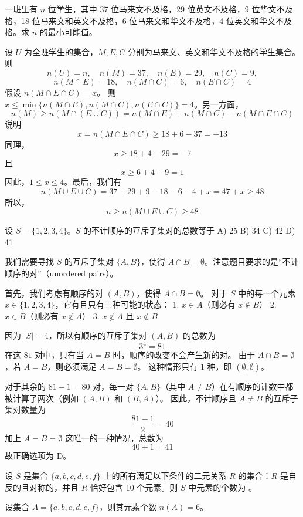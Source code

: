\begin{questions}
\question 一班里有 $n$ 位学生，其中 37 位马来文不及格，29 位英文不及格，9 位华文不及格，18 位马来文和英文不及格，6 位马来文和华文不及格，4 位英文和华文不及格。求 $n$ 的最小可能值。

\begin{solution}
设 $U$ 为全班学生的集合，$M, E, C$ 分别为马来文、英文和华文不及格的学生集合。则
\[
n(U) = n, \quad n(M) = 37, \quad n(E) = 29, \quad n(C) = 9,
\]
\[
n(M \cap E) = 18, \quad n(M \cap C) = 6, \quad n(E \cap C) = 4
\]
假设 $n(M \cap E \cap C) = x$。
则 $x \le \min\{n(M \cap E), n(M \cap C), n(E \cap C)\} = 4$。另一方面，
\[
n(M) \ge n(M \cap (E \cup C)) = n(M \cap E) + n(M \cap C) - n(M \cap E \cap C)
\]
说明
\[
x = n(M \cap E \cap C) \ge 18 + 6 - 37 = -13
\]
同理，
\[
x \ge 18 + 4 - 29 = -7
\]
且
\[
x \ge 6 + 4 - 9 = 1
\]
因此，$1 \le x \le 4$。最后，我们有
\[
n(M \cup E \cup C) = 37 + 29 + 9 - 18 - 6 - 4 + x = 47 + x \ge 48
\]
所以，
\[
n \ge n(M \cup E \cup C) \ge 48
\]
\end{solution}

\question 设 $S = \{1, 2, 3, 4\}$。$S$ 的不计顺序的互斥子集对的总数等于
A) 25 \qquad B) 34 \qquad C) 42 \qquad D) 41

\begin{solution}
我们需要寻找 $S$ 的互斥子集对 $\{A, B\}$，使得 $A \cap B = \emptyset$。注意题目要求的是“不计顺序的对”（unordered pairs）。

首先，我们考虑有顺序的对 $(A, B)$，使得 $A \cap B = \emptyset$。
对于 $S$ 中的每一个元素 $x \in \{1, 2, 3, 4\}$，它有且只有三种可能的状态：
1. $x \in A$（则必有 $x \notin B$）
2. $x \in B$（则必有 $x \notin A$）
3. $x \notin A$ 且 $x \notin B$

因为 $|S| = 4$，所以有顺序的互斥子集对 $(A, B)$ 的总数为
\[
3^4 = 81
\]
在这 $81$ 对中，只有当 $A = B$ 时，顺序的改变不会产生新的对。
由于 $A \cap B = \emptyset$，若 $A = B$，则必须满足 $A = B = \emptyset$。
这种情形只有 $1$ 种，即 $(\emptyset, \emptyset)$。

对于其余的 $81 - 1 = 80$ 对，每一对 $\{A, B\}$（其中 $A \neq B$）在有顺序的计数中都被计算了两次（例如 $(A, B)$ 和 $(B, A)$）。
因此，不计顺序且 $A \neq B$ 的互斥子集对数量为
\[
\frac{81 - 1}{2} = 40
\]
加上 $A = B = \emptyset$ 这唯一的一种情况，总数为
\[
40 + 1 = 41
\]
故正确选项为 D。
\end{solution}

\question
设 $S$ 是集合 $\{a, b, c, d, e, f\}$ 上的所有满足以下条件的二元关系 $R$ 的集合：$R$ 是自反的且对称的，并且 $R$ 恰好包含 10 个元素。则 $S$ 中元素的个数为 \underline{\hspace{2cm}}。
\begin{solution}
设集合 $A = \{a, b, c, d, e, f\}$，则其元素个数 $n(A) = 6$。


\end{solution}
\end{questions}
